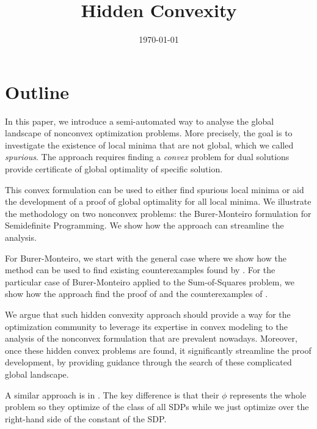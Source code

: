 \documentclass[11pt]{article}
\title{Hidden Convexity}
\date{\today}
\begin{document}
\maketitle

\section{Outline}

In this paper, we introduce a semi-automated way to analyse the global landscape
of nonconvex optimization problems.  More precisely, the goal is to investigate
the existence of local minima that are not global, which we called
\emph{spurious}.  The approach requires finding a \emph{convex} problem for dual
solutions provide certificate of global optimality of specific solution.

This convex formulation can be used to either find spurious local minima or aid
the development of a proof of global optimality for all local minima.  We
illustrate the methodology on two nonconvex problems: the Burer-Monteiro
formulation for Semidefinite Programming.  We show how the approach can
streamline the analysis.

For Burer-Monteiro, we start with the general case where we show how the method
can be used to find existing counterexamples found by
\cite{bhojanapalli2018smoothed}.  For the particular case of Burer-Monteiro
applied to the Sum-of-Squares problem, we show how the approach find the proof
of \cite{legat2023lowrank} and the counterexamples of
\cite{blekherman2024Spurious}.

We argue that such hidden convexity approach should provide a way for the
optimization community to leverage its expertise in convex modeling to the
analysis of the nonconvex formulation that are prevalent nowadays.  Moreover,
once these hidden convex problems are found, it significantly streamline the
proof development, by providing guidance through the search of these complicated
global landscape.

A similar approach is in \cite[(3.2)]{zhang2024improved}.  The key difference is
that their $\phi$ represents the whole problem so they optimize of the class of
all SDPs while we just optimize over the right-hand side of the constant of the
SDP.
\end{document}
